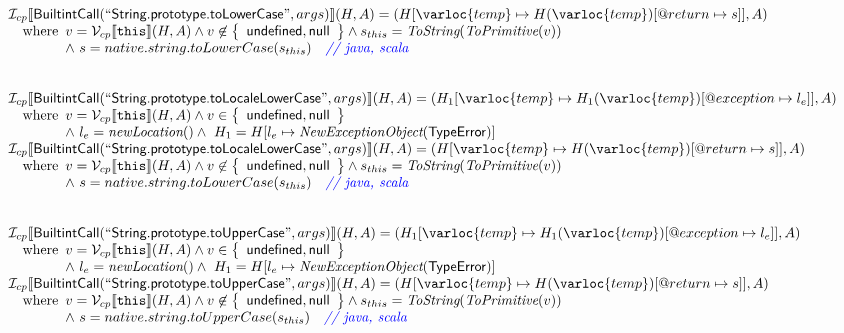\[\begin{array}{l}
\I _{cp}\lbr \SF{BuiltintCall}(``\SF{String.prototype.toLowerCase}",args)\rbr(H,A)
 = (H[\varloc{temp}\mapsto H(\varloc{temp})[\varprop{return}\mapsto s]], A) \\
\quad\wherec{
  v = \V _{cp}\lbr \TT{this}\rbr (H,A) \land v \not\in \set{\SF{undefined}, \SF{null}}
  \land s_{this} = \hf{ToString}(\hf{ToPrimitive}(v))\\
  \land\ s = native.string.toLowerCase(s_{this}) \quad\comment{{\inblue // java, scala}}\\
  }\\
\\\\



\I _{cp}\lbr \SF{BuiltintCall}(``\SF{String.prototype.toLocaleLowerCase}",args)\rbr(H,A)
 = (H_1[\varloc{temp}\mapsto H_1(\varloc{temp})[\varprop{exception}\mapsto l_e]], A) \\
\quad\wherec{
  v = \V _{cp}\lbr \TT{this}\rbr (H,A) \land v \in \set{\SF{undefined}, \SF{null}}\\
  \land\ l_e = \hf{newLocation}() \land\ H_1=H[l_e\mapsto\hf{NewExceptionObject}(\SF{TypeError})] 
  }\\
  
\I _{cp}\lbr \SF{BuiltintCall}(``\SF{String.prototype.toLocaleLowerCase}",args)\rbr(H,A)
 = (H[\varloc{temp}\mapsto H(\varloc{temp})[\varprop{return}\mapsto s]], A) \\
\quad\wherec{
  v = \V _{cp}\lbr \TT{this}\rbr (H,A) \land v \not\in \set{\SF{undefined}, \SF{null}}
  \land s_{this} = \hf{ToString}(\hf{ToPrimitive}(v))\\
  \land\ s = native.string.toLowerCase(s_{this}) \quad\comment{{\inblue // java, scala}}\\
  }\\
\\\\


  
\I _{cp}\lbr \SF{BuiltintCall}(``\SF{String.prototype.toUpperCase}",args)\rbr(H,A)
 = (H_1[\varloc{temp}\mapsto H_1(\varloc{temp})[\varprop{exception}\mapsto l_e]], A) \\
\quad\wherec{
  v = \V _{cp}\lbr \TT{this}\rbr (H,A) \land v \in \set{\SF{undefined}, \SF{null}}\\
  \land\ l_e = \hf{newLocation}() \land\ H_1=H[l_e\mapsto\hf{NewExceptionObject}(\SF{TypeError})] 
  }\\
  
\I _{cp}\lbr \SF{BuiltintCall}(``\SF{String.prototype.toUpperCase}",args)\rbr(H,A)
 = (H[\varloc{temp}\mapsto H(\varloc{temp})[\varprop{return}\mapsto s]], A) \\
\quad\wherec{
  v = \V _{cp}\lbr \TT{this}\rbr (H,A) \land v \not\in \set{\SF{undefined}, \SF{null}}
  \land s_{this} = \hf{ToString}(\hf{ToPrimitive}(v))\\
  \land\ s = native.string.toUpperCase(s_{this}) \quad\comment{{\inblue // java, scala}}\\
  }\\
\\\\



\end{array}\]
